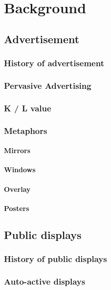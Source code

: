 
\chapter{Background} %

\label{Chapter2} %


\section{Advertisement}
\subsection{History of advertisement}
\subsection{Pervasive Advertising}
\subsection{K / L value}
\subsection{Metaphors}
\subsubsection{Mirrors}
\subsubsection{Windows}
\subsubsection{Overlay}
\subsubsection{Posters}

\section{Public displays}
\subsection{History of public displays}
\subsection{Auto-active displays}

